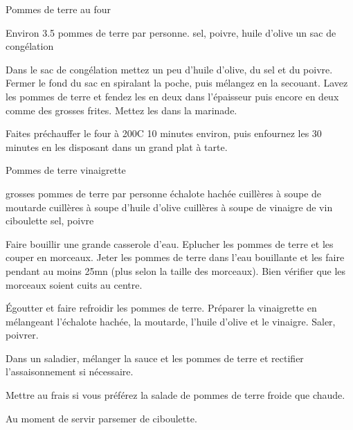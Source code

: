 \begin{recette}{Pommes de terre au four}
\begin{ingredients}
\ingredient Environ 3.5 pommes de terre par personne.
\ingredient sel, poivre, huile d'olive
\ingredient un sac de congélation
\end{ingredients}

\begin{preparation}
\etape Dans le sac de congélation mettez un peu d'huile d'olive, du sel et du poivre. Fermer le fond du sac en spiralant la poche, puis mélangez en la secouant.
\etape Lavez les pommes de terre et fendez les en deux dans l'épaisseur puis encore en deux comme des grosses frites.
\etape Mettez les dans la marinade.
\end{preparation}

\begin{cuisson}
Faites préchauffer le four à 200\degres C 10 minutes environ, puis enfournez les 30 minutes en les disposant dans un grand plat à tarte.
\end{cuisson}

\end{recette}

\begin{recette}{Pommes de terre vinaigrette}
\begin{ingredients}
 grosses pommes de terre par personne
 échalote hachée
 cuillères à soupe de moutarde
 cuillères à soupe d'huile d'olive
 cuillères à soupe de vinaigre de vin
\ingredient ciboulette
\ingredient sel, poivre
\end{ingredients}

\begin{preparation}
\etape Faire bouillir une grande casserole d'eau. Eplucher les pommes de terre et les couper en morceaux. Jeter les pommes de terre dans l'eau bouillante et les faire pendant au moins 25mn (plus selon la taille des morceaux). Bien vérifier que les morceaux soient cuits au centre.

\etape Égoutter et faire refroidir les pommes de terre. Préparer la vinaigrette en mélangeant l'échalote hachée, la moutarde, l'huile d'olive et le vinaigre. Saler, poivrer.

\etape Dans un saladier, mélanger la sauce et les pommes de terre et rectifier l'assaisonnement si nécessaire.

\begin{remarque}
Mettre au frais si vous préférez la salade de pommes de terre froide que chaude.
\end{remarque}

\etape Au moment de servir parsemer de ciboulette.
\end{preparation}
\end{recette}
